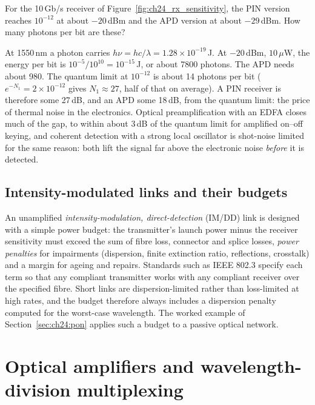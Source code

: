 \begin{worked}
For the 10\,Gb/s receiver of Figure~\ref{fig:ch24_rx_sensitivity}, the PIN version reaches $10^{-12}$ at
about $-20$\,dBm and the APD version at about $-29$\,dBm. How many photons per bit are these?

At 1550\,nm a photon carries $h\nu=hc/\lambda=1.28\times10^{-19}$\,J. At $-20$\,dBm, $10\,\mu$W, the
energy per bit is $10^{-5}/10^{10}=10^{-15}$\,J, or about 7800 photons. The APD needs about 980. The
quantum limit at $10^{-12}$ is about 14 photons per bit ($e^{-N_1}=2\times10^{-12}$ gives $N_1\approx27$,
half of that on average). A PIN receiver is therefore some 27\,dB, and an APD some 18\,dB, from the
quantum limit: the price of thermal noise in the electronics. Optical preamplification with an EDFA
closes much of the gap, to within about 3\,dB of the quantum limit for amplified on--off keying, and
coherent detection with a strong local oscillator is shot-noise limited for the same reason: both lift
the signal far above the electronic noise \emph{before} it is detected.
\end{worked}

\subsection{Intensity-modulated links and their budgets}

An unamplified \emph{intensity-modulation, direct-detection} (IM/DD) link is designed with a simple power
budget: the transmitter's launch power minus the receiver sensitivity must exceed the sum of fibre loss,
connector and splice losses, \emph{power penalties} for impairments (dispersion, finite extinction ratio,
reflections, crosstalk) and a margin for ageing and repairs. Standards such as IEEE 802.3 specify each
term so that any compliant transmitter works with any compliant receiver over the specified fibre. Short
links are dispersion-limited rather than loss-limited at high rates, and the budget therefore always
includes a dispersion penalty computed for the worst-case wavelength. The worked example of
Section~\ref{sec:ch24:pon} applies such a budget to a passive optical network.

\section{Optical amplifiers and wavelength-division multiplexing}
\label{sec:ch24:wdm}

